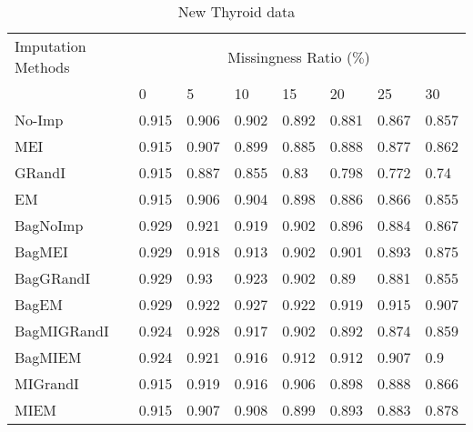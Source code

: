 \documentclass{iosart2c}
\begin{document}

\begin{table*}[htb]
\centering
\caption{New Thyroid data}
\label{tab:thyroid}
    \begin{tabular}{|p{25mm}|l|l|l|l|l|l|l|} \hline
     Imputation Methods    & \multicolumn{7}{c|}{Missingness Ratio ($\%$)} \\ \cline{2-8}
                           &  0 & 5 & 10 & 15 & 20 & 25 & 30 \\ \hline
No-Imp & 0.915 & 0.906 & 0.902 & 0.892 & 0.881 & 0.867 & 0.857 \\ \hline
MEI & 0.915 & 0.907 & 0.899 & 0.885 & 0.888 & 0.877 & 0.862 \\ \hline
GRandI & 0.915 & 0.887 & 0.855 & 0.83 & 0.798 & 0.772 & 0.74 \\ \hline
EM & 0.915 & 0.906 & 0.904 & 0.898 & 0.886 & 0.866 & 0.855 \\ \hline \hline
BagNoImp & 0.929 & 0.921 & 0.919 & 0.902 & 0.896 & 0.884 & 0.867 \\ \hline
BagMEI & 0.929 & 0.918 & 0.913 & 0.902 & 0.901 & 0.893 & 0.875 \\ \hline
BagGRandI & 0.929 & 0.93 & 0.923 & 0.902 & 0.89 & 0.881 & 0.855 \\ \hline
BagEM & 0.929 & 0.922 & 0.927 & 0.922 & 0.919 & 0.915 & 0.907 \\ \hline \hline
BagMIGRandI & 0.924 & 0.928 & 0.917 & 0.902 & 0.892 & 0.874 & 0.859 \\ \hline
BagMIEM & 0.924 & 0.921 & 0.916 & 0.912 & 0.912 & 0.907 & 0.9 \\ \hline \hline
MIGrandI & 0.915 & 0.919 & 0.916 & 0.906 & 0.898 & 0.888 & 0.866 \\ \hline
MIEM & 0.915 & 0.907 & 0.908 & 0.899 & 0.893 & 0.883 & 0.878 \\ \hline
\end{tabular}
\end{table*}

\end{document}
